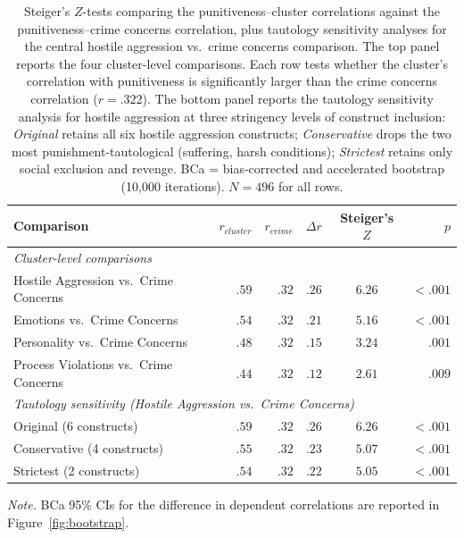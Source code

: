 \begin{table}[htbp]
  \centering
  \caption{Steiger's $Z$-tests comparing the punitiveness--cluster correlations against the punitiveness--crime concerns correlation, plus tautology sensitivity analyses for the central hostile aggression vs.\ crime concerns comparison. The top panel reports the four cluster-level comparisons. Each row tests whether the cluster's correlation with punitiveness is significantly larger than the crime concerns correlation ($r = .322$). The bottom panel reports the tautology sensitivity analysis for hostile aggression at three stringency levels of construct inclusion: \textit{Original} retains all six hostile aggression constructs; \textit{Conservative} drops the two most punishment-tautological (suffering, harsh conditions); \textit{Strictest} retains only social exclusion and revenge. BCa = bias-corrected and accelerated bootstrap (10{,}000 iterations). $N = 496$ for all rows.}
  \label{tab:steiger}
  \small
  \begin{tabular}{lrrrcr}
    \toprule
    Comparison & $r_\textit{cluster}$ & $r_\textit{crime}$ & $\Delta r$ & Steiger's $Z$ & $p$ \\
    \midrule
    \multicolumn{6}{l}{\textit{Cluster-level comparisons}} \\
    Hostile Aggression vs.\ Crime Concerns & $.59$ & $.32$ & $.26$ & $6.26$ & $<.001$ \\
    Emotions vs.\ Crime Concerns           & $.54$ & $.32$ & $.21$ & $5.16$ & $<.001$ \\
    Personality vs.\ Crime Concerns        & $.48$ & $.32$ & $.15$ & $3.24$ & $.001$  \\
    Process Violations vs.\ Crime Concerns & $.44$ & $.32$ & $.12$ & $2.61$ & $.009$  \\
    \midrule
    \multicolumn{6}{l}{\textit{Tautology sensitivity (Hostile Aggression vs.\ Crime Concerns)}} \\
    Original (6 constructs)     & $.59$ & $.32$ & $.26$ & $6.26$ & $<.001$ \\
    Conservative (4 constructs) & $.55$ & $.32$ & $.23$ & $5.07$ & $<.001$ \\
    Strictest (2 constructs)    & $.54$ & $.32$ & $.22$ & $5.05$ & $<.001$ \\
    \bottomrule
  \end{tabular}

  \vspace{0.5em}
  \footnotesize
  \textit{Note.} BCa 95\% CIs for the difference in dependent correlations are reported in Figure~\ref{fig:bootstrap}.
\end{table}

